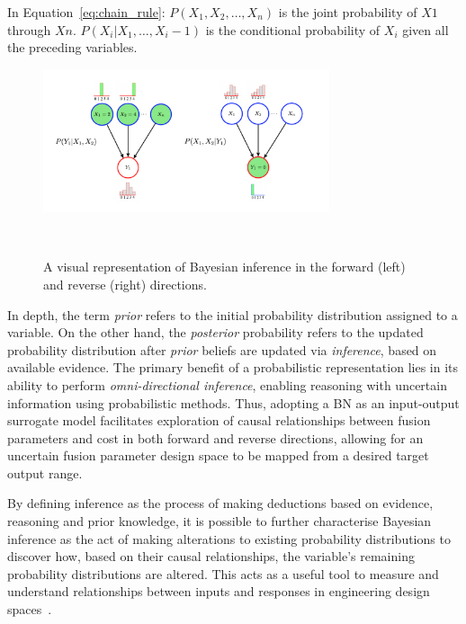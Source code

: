 \documentclass[journal]{IEEEtran}
\begin{document}
In Equation~\ref{eq:chain_rule}: $P(X_1, X_2, \ldots, X_n)$ is the joint probability of $X1$ through $Xn$. $P(X_i | X_1, \ldots, X_i-1)$ is the conditional probability of $X_i$ given all the preceding variables.

\begin{figure}[t]
    \centering
    \includegraphics[width=0.75\textwidth]{figures/methodology/inference_F&R_diagram.png}
    \caption{A visual representation of Bayesian inference in the forward (left) and reverse (right) directions.}~\label{fig:inference_F&R_diagram}
\end{figure}

In depth, the term \textit{prior} refers to the initial probability distribution assigned to a variable. On the other hand, the \textit{posterior} probability refers to the updated probability distribution after \textit{prior} beliefs are updated via \textit{inference}, based on available evidence. The primary benefit of a probabilistic representation lies in its ability to perform \textit{omni-directional inference}, enabling reasoning with uncertain information using probabilistic methods. Thus, adopting a BN as an input-output surrogate model facilitates exploration of causal relationships between fusion parameters and cost in both forward and reverse directions, allowing for an uncertain fusion parameter design space to be mapped from a desired target output range. 

By defining inference as the process of making deductions based on evidence, reasoning and prior knowledge, it is possible to further characterise Bayesian inference as the act of making alterations to existing probability distributions to discover how, based on their causal relationships, the variable's remaining probability distributions are altered. This acts as a useful tool to measure and understand relationships between inputs and responses in engineering design spaces~\cite{Koller2009}. 
\end{document}
